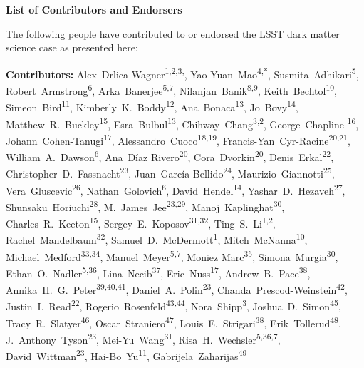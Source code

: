 
\begin{center}
  {\Large \bf List of Contributors and Endorsers}
\end{center}
\bigskip

The following people have contributed to or endorsed the LSST dark matter science case as presented here:

\def\altaffilmark#1{\textsuperscript{#1}}
\def\affil#1{\noindent #1 \\}

\normalsize
\begin{raggedright}
\textbf{Contributors:}
Alex~Drlica-Wagner\altaffilmark{1,2,3,\textdagger},
Yao-Yuan~Mao\altaffilmark{4,*},
Susmita~Adhikari\altaffilmark{5},
Robert~Armstrong\altaffilmark{6},
Arka~Banerjee\altaffilmark{5,7},
Nilanjan~Banik\altaffilmark{8,9},
Keith~Bechtol\altaffilmark{10},
Simeon~Bird\altaffilmark{11},
Kimberly~K.~Boddy\altaffilmark{12},
Ana~Bonaca\altaffilmark{13},
Jo~Bovy\altaffilmark{14},
Matthew~R.~Buckley\altaffilmark{15},
Esra~Bulbul\altaffilmark{13},
Chihway~Chang\altaffilmark{3,2},
George~Chapline \altaffilmark{16},
Johann~Cohen-Tanugi\altaffilmark{17},
Alessandro~Cuoco\altaffilmark{18,19},
Francis-Yan~Cyr-Racine\altaffilmark{20,21},
William~A.~Dawson\altaffilmark{6},
Ana~D\'{i}az Rivero\altaffilmark{20},
Cora~Dvorkin\altaffilmark{20},
Denis~Erkal\altaffilmark{22},
Christopher~D.~Fassnacht\altaffilmark{23},
Juan~Garc\'ia-Bellido\altaffilmark{24},
Maurizio~Giannotti\altaffilmark{25},
Vera~Gluscevic\altaffilmark{26},
Nathan~Golovich\altaffilmark{6},
David~Hendel\altaffilmark{14},
Yashar~D.~Hezaveh\altaffilmark{27},
Shunsaku~Horiuchi\altaffilmark{28},
M.~James~Jee\altaffilmark{23,29},
Manoj~Kaplinghat\altaffilmark{30},
Charles~R.~Keeton\altaffilmark{15},
Sergey~E.~Koposov\altaffilmark{31,32},
Ting~S.~Li\altaffilmark{1,2},
Rachel~Mandelbaum\altaffilmark{32},
Samuel~D.~McDermott\altaffilmark{1},
Mitch~McNanna\altaffilmark{10},
Michael~Medford\altaffilmark{33,34},
Manuel~Meyer\altaffilmark{5,7},
Moniez Marc\altaffilmark{35},
Simona~Murgia\altaffilmark{30},
Ethan~O.~Nadler\altaffilmark{5,36},
Lina~Necib\altaffilmark{37},
Eric~Nuss\altaffilmark{17},
Andrew~B.~Pace\altaffilmark{38},
Annika~H.~G.~Peter\altaffilmark{39,40,41},
Daniel~A.~Polin\altaffilmark{23},
Chanda~Prescod-Weinstein\altaffilmark{42},
Justin~I.~Read\altaffilmark{22},
Rogerio~Rosenfeld\altaffilmark{43,44},
Nora~Shipp\altaffilmark{3},
Joshua~D.~Simon\altaffilmark{45},
Tracy~R.~Slatyer\altaffilmark{46},
Oscar~Straniero\altaffilmark{47},
Louis~E.~Strigari\altaffilmark{38},
Erik~Tollerud\altaffilmark{48},
J.~Anthony~Tyson\altaffilmark{23},
Mei-Yu~Wang\altaffilmark{31},
Risa~H.~Wechsler\altaffilmark{5,36,7},
David~Wittman\altaffilmark{23},
Hai-Bo~Yu\altaffilmark{11},
Gabrijela~Zaharijas\altaffilmark{49}


\end{raggedright}
